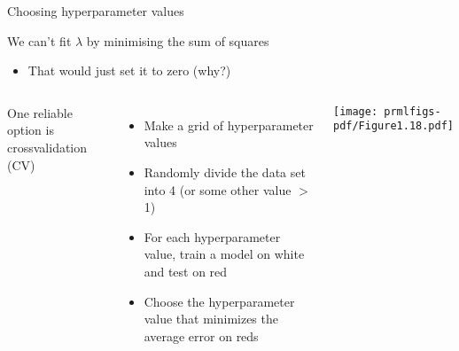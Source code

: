 \documentclass{hertieteaching}
\begin{document}
\begin{frame}{Choosing hyperparameter values}

We can't fit $\lambda$ by minimising the sum of squares
\begin{itemize}
  \item That would just set it to zero (why?)
\end{itemize}
\pause

\medskip
\begin{columns}[T,onlytextwidth]

One reliable option is crossvalidation (CV)
\begin{itemize}
  \item Make a grid of hyperparameter values
  \item Randomly divide the data set into 4 (or some other value $>$ 1)
  \item For each hyperparameter  value, train a model on white and test on red
  \item Choose the hyperparameter value that minimizes the average error on reds
\end{itemize}
\medskip
\centerline{\texttt{[image: prmlfigs-pdf/Figure1.18.pdf]}}

\end{columns}






\end{frame}


%
%
%
%
\end{document}
